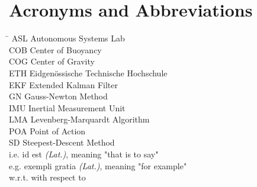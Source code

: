 \section*{Acronyms and Abbreviations}

\begin{tabbing}
 \hspace*{1.6cm}  \= \kill
 ASL \> Autonomous Systems Lab \\[0.5ex]
 COB \> Center of Buoyancy \\[0.5ex]
 COG \> Center of Gravity \\[0.5ex]
 ETH \> Eidgenössische Technische Hochschule \\[0.5ex]
 EKF \> Extended Kalman Filter \\[0.5ex]
 GN  \> Gauss-Newton Method \\[0.5ex]
 IMU \> Inertial Measurement Unit \\[0.5ex]
 LMA \> Levenberg-Marquardt Algorithm \\[0.5ex]
 POA \> Point of Action \\[0.5ex]
 SD  \> Steepest-Descent Method \\[0.5ex]
 i.e.   \> id est \textit{(Lat.)}, meaning "that is to say" \\[0.5ex]
 e.g.   \> exempli gratia \textit{(Lat.)}, meaning "for example" \\[0.5ex]
 w.r.t. \> with respect to \\[0.5ex]
 
\end{tabbing}